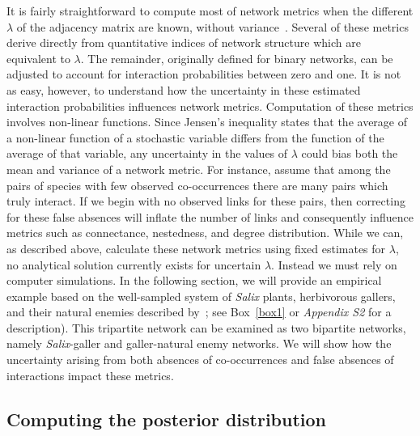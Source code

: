 \documentclass[12pt]{article}
\begin{document}
    It is fairly straightforward to compute most of network metrics when the different $\lambda$ of the adjacency matrix are known, without variance~\citep{Poisot2016}. Several of these metrics derive directly from quantitative indices of network structure which are equivalent to $\lambda$. The remainder, originally defined for binary networks, can be adjusted to account for interaction probabilities between zero and one. It is not as easy, however, to understand how the uncertainty in these estimated interaction probabilities influences network metrics. Computation of these metrics involves non-linear functions. Since Jensen's inequality states that the average of a non-linear function of a stochastic variable differs from the function of the average of that variable, any uncertainty in the values of $\lambda$ could bias both the mean and variance of a network metric. For instance, assume that among the pairs of species with few observed co-occurrences there are many pairs which truly interact. If we begin with no observed links for these pairs, then correcting for these false absences will inflate the number of links and consequently influence metrics such as connectance, nestedness, and degree distribution. While we can, as described above, calculate these network metrics using fixed estimates for $\lambda$, no analytical solution currently exists for uncertain $\lambda$. Instead we must rely on computer simulations. In the following section, we will provide an empirical example based on the well-sampled system of \emph{Salix}  plants, herbivorous gallers, and their natural enemies described by~\citet{Kopelke2017}; see Box~\ref{box1} or \emph{Appendix S2} for a description). This tripartite network can be examined as two bipartite networks, namely \emph{Salix}-galler and galler-natural enemy networks. We will show how the uncertainty arising from both absences of co-occurrences and false absences of interactions impact these metrics. %



  \subsection*{Computing the posterior distribution}
\end{document}
